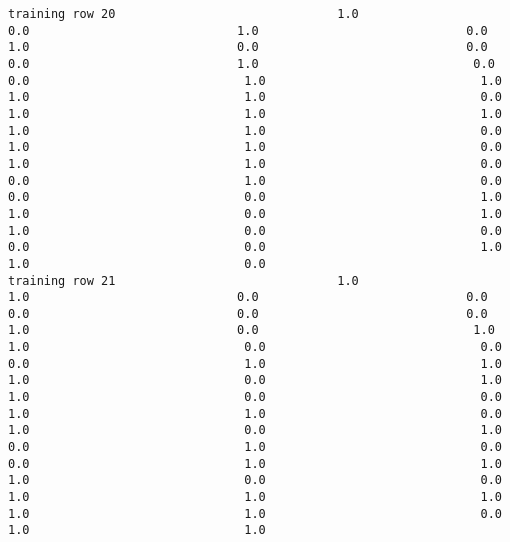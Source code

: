 \documentclass[11pt]{article}
\begin{document}
\begin{verbatim}
training row 20                               1.0                             0.0                             1.0                             0.0                             1.0                             0.0                             0.0                             0.0                             1.0                              0.0                              0.0                              1.0                              1.0                              1.0                              1.0                              0.0                              1.0                              1.0                              1.0                              1.0                              1.0                              0.0                              1.0                              1.0                              0.0                              1.0                              1.0                              0.0                              0.0                              1.0                              0.0                              0.0                              0.0                              1.0                              1.0                              0.0                              1.0                              1.0                              0.0                              0.0                              0.0                              0.0                              1.0                              1.0                              0.0
training row 21                               1.0                             1.0                             0.0                             0.0                             0.0                             0.0                             0.0                             1.0                             0.0                              1.0                              1.0                              0.0                              0.0                              0.0                              1.0                              1.0                              1.0                              0.0                              1.0                              1.0                              0.0                              0.0                              1.0                              1.0                              0.0                              1.0                              0.0                              1.0                              0.0                              1.0                              0.0                              0.0                              1.0                              1.0                              1.0                              0.0                              0.0                              1.0                              1.0                              1.0                              1.0                              1.0                              0.0                              1.0                              1.0

\end{verbatim}
\end{document}
